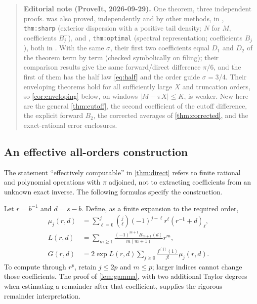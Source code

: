 \documentclass[11pt,a4paper]{article}
\theoremstyle{definition}
\numberwithin{equation}{section}
\newcommand{\rising}[2]{(#1)_{#2}}
\begin{document}
\begin{quote}\small\textbf{Editorial note (ProveIt, 2026-09-29).} One theorem, three independent proofs.  was also proved, independently and by other methods, in , \texttt{thm:sharp} (exterior dispersion with a positive tail density; $N$ for $M$, coefficients $B_j^-$), and , \texttt{thm:optimal} (spectral representation; coefficients $B_j$), both in . With the same $\sigma$, their first two coefficients equal $D_1$ and $D_2$ of the theorem term by term (checked symbolically on filing); their comparison results give the same forward/direct difference $\pi/6$, and the first of them has the half law \eqref{eq:half} and the order guide $\sigma=3/4$. Their enveloping theorems hold for all sufficiently large $X$ and truncation orders, so \cref{cor:enveloping} below, on windows $|M-\pi X|\le K$, is weaker. New here are the general \cref{thm:cutoff}, the second coefficient of the cutoff difference, the explicit forward $B_2$, the corrected averages of \cref{thm:corrected}, and the exact-rational error enclosures.\end{quote}

\subsection{An effective all-orders construction}
\label{sec:algorithm}
The statement ``effectively computable'' in \cref{thm:direct} refers to finite rational and polynomial operations with $\pi$ adjoined, not to extracting coefficients from an unknown exact inverse. The following formulas specify the construction.

Let $r=b^{-1}$ and $d=s-b$. Define, as a finite expansion to the required order,
\begin{align}
 \mu_j(r,d)&=\sum_{\ell=0}^j\binom j\ell(-1)^{j-\ell}
                      r^\ell\rising{r^{-1}+d}{\ell},\label{eq:mualg}\\
 L(r,d)&=\sum_{m\ge1}
       \frac{(-1)^{m+1}B_{m+1}(d)}{m(m+1)}r^m,\label{eq:Lalg}\\
 G(r,d)&=2\exp L(r,d)
            \sum_{j\ge0}\frac{f^{(j)}(1)}{j!}\mu_j(r,d).
 \label{eq:Galg}
\end{align}
To compute through $r^p$, retain $j\le2p$ and $m\le p$; larger indices cannot change those coefficients. The proof of \cref{lem:gamma}, with two additional Taylor degrees when estimating a remainder after that coefficient, supplies the rigorous remainder interpretation.
\end{document}
